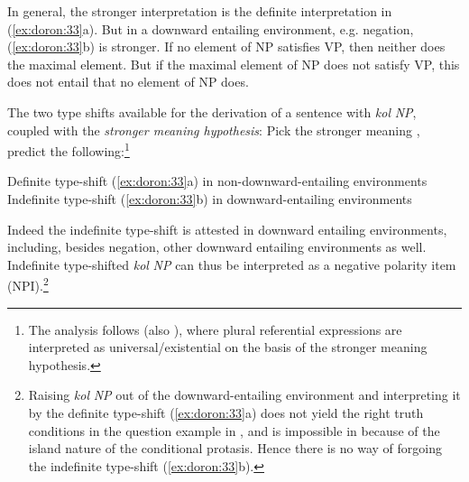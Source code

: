 \documentclass[output=paper]{langsci/langscibook}
\begin{document}
In general, the stronger interpretation is the definite interpretation in (\ref{ex:doron:33}a). But in a downward entailing environment, e.g. negation, (\ref{ex:doron:33}b) is stronger. If no element of NP satisfies VP, then neither does the maximal element. But if the maximal element of NP does not satisfy VP, this does not entail that no element of NP does.

The two type shifts available for the derivation of a sentence with \textit{kol} \textit{NP}, coupled with the \textit{stronger meaning hypothesis}: Pick the stronger meaning \citep{DalrympleEtAl1994}, predict the following:\footnote{The analysis follows \citet{Krifka1996} (also \citealt{Malamud:2012,Spector2018}), where plural referential expressions are interpreted as universal\slash existential on the basis of the stronger meaning hypothesis.}

\ea%
    \label{ex:doron:34}
\ea Definite type-shift  (\ref{ex:doron:33}a) in non-downward-entailing environments
\ex Indefinite type-shift  (\ref{ex:doron:33}b) in downward-entailing environments
\z
\z


Indeed the indefinite type-shift is attested in downward entailing environments, including, besides negation, other downward entailing environments as well. Indefinite type-shifted \textit{kol} \textit{NP} can thus be interpreted as a negative polarity item (NPI).\footnote{Raising \textit{kol} \textit{NP} out of the downward-entailing environment and interpreting it by the definite type-shift (\ref{ex:doron:33}a) does not yield the right truth conditions in the question example in , and is impossible in  because of the island nature of the conditional protasis. Hence there is no way of forgoing the indefinite type-shift (\ref{ex:doron:33}b).}\largerpage[-2]
\end{document}
